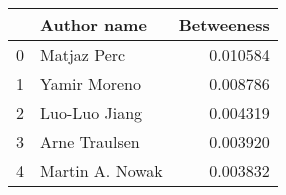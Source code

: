 \begin{tabular}{llr}
\toprule
{} &      Author name &  Betweeness \\
\midrule
0 &      Matjaz Perc &    0.010584 \\
1 &     Yamir Moreno &    0.008786 \\
2 &    Luo-Luo Jiang &    0.004319 \\
3 &    Arne Traulsen &    0.003920 \\
4 &  Martin A. Nowak &    0.003832 \\
\bottomrule
\end{tabular}
